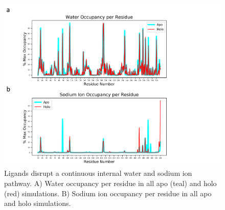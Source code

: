 \begin{figure}
\centering
\includegraphics[width=\textwidth]{./figures/water_na_plots.png}
\caption{Ligands disrupt a continuous internal water and sodium ion pathway. A) Water occupancy per residue in all apo (teal) and holo (red) simulations. B) Sodium ion occupancy per residue in all apo and holo simulations.}
\label{fig:water_na_plots}
\end{figure}

